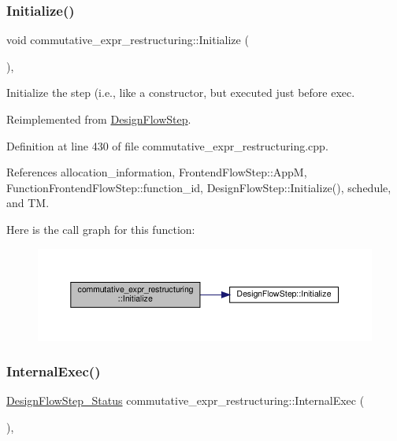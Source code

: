 \subsubsection{\texorpdfstring{Initialize()}{Initialize()}}
{\footnotesize\ttfamily void commutative\+\_\+expr\+\_\+restructuring\+::\+Initialize (\begin{DoxyParamCaption}{ }\end{DoxyParamCaption})\hspace{0.3cm}{\ttfamily [override]}, {\ttfamily [virtual]}}



Initialize the step (i.\+e., like a constructor, but executed just before exec. 



Reimplemented from \hyperlink{classDesignFlowStep_a44b50683382a094976e1d432a7784799}{Design\+Flow\+Step}.



Definition at line 430 of file commutative\+\_\+expr\+\_\+restructuring.\+cpp.



References allocation\+\_\+information, Frontend\+Flow\+Step\+::\+AppM, Function\+Frontend\+Flow\+Step\+::function\+\_\+id, Design\+Flow\+Step\+::\+Initialize(), schedule, and TM.

Here is the call graph for this function\+:
\nopagebreak
\begin{figure}[H]
\begin{center}
\leavevmode
\includegraphics[width=350pt]{db/d8c/classcommutative__expr__restructuring_ae09db402c964798f3e6386e65095d0b3_cgraph}
\end{center}
\end{figure}
\mbox{\label{classcommutative__expr__restructuring_adbf4a35cb5e3a0a7be1abe3aca2f46bf}} 
\subsubsection{\texorpdfstring{Internal\+Exec()}{InternalExec()}}
{\footnotesize\ttfamily \hyperlink{design__flow__step_8hpp_afb1f0d73069c26076b8d31dbc8ebecdf}{Design\+Flow\+Step\+\_\+\+Status} commutative\+\_\+expr\+\_\+restructuring\+::\+Internal\+Exec (\begin{DoxyParamCaption}{ }\end{DoxyParamCaption})\hspace{0.3cm}{\ttfamily [override]}, {\ttfamily [virtual]}}



